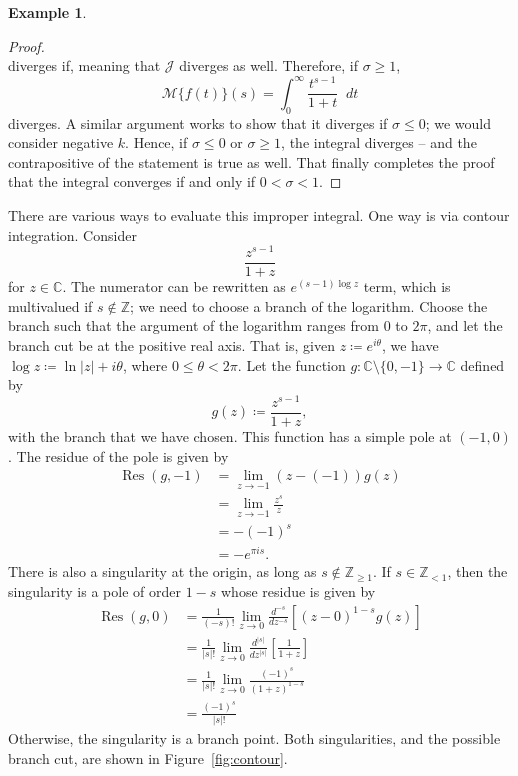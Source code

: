 \documentclass[a4paper]{article}
\newcommand*\diff{\mathop{}\!d} %
\newcommand{\C}{\mathbb{C}}
\newcommand{\Z}{\mathbb{Z}}
\DeclareMathOperator{\Res}{Res}
\theoremstyle{definition}
\newtheorem{example}[theorem]{Example}
\begin{document}
\begin{example}
\begin{proof}
\begin{equation*}
        \end{equation*}
        diverges if, meaning that $\mathcal{J}$ diverges as well.
        Therefore, if $\sigma \geq 1$,
        \begin{equation*}
            \mathcal{M}\{f(t)\}(s) = \int_0^\infty \frac{t^{s-1}}{1+t} \diff t
        \end{equation*}
        diverges.
        A similar argument works to show that it diverges if $\sigma \leq 0$; we would consider negative $k$.
        Hence, if $\sigma \leq 0$ or $\sigma \geq 1$, the integral diverges -- and the contrapositive of the statement is true as well.
        That finally completes the proof that the integral converges if and only if $0 < \sigma < 1$.
    \end{proof}
    There are various ways to evaluate this improper integral.
    One way is via contour integration.
    Consider
    \begin{equation*}
        \frac{z^{s-1}}{1+z}
    \end{equation*}
    for $z \in \C$.
    The numerator can be rewritten as $e^{(s-1) \log z}$ term, which is multivalued if $s \notin \Z$; we need to choose a branch of the logarithm.
    Choose the branch such that the argument of the logarithm ranges from 0 to $2\pi$, and let the branch cut be at the positive real axis.
    That is, given $z \coloneq e^{i \theta}$, we have $\log z \coloneq \ln \lvert z \rvert + i\theta$, where $0 \leq \theta < 2\pi$.
    Let the function $g \colon \C \setminus \{0, -1\} \to \C$ defined by
    \begin{equation*}
        g(z) \coloneq \frac{z^{s-1}}{1+z},
    \end{equation*}
    with the branch that we have chosen.
    This function has a simple pole at $(-1,0)$.
    The residue of the pole is given by
    \begin{align*}
        \Res (g,-1) & = \lim_{z \to -1} (z-(-1))g(z) \\&= \lim_{z \to -1} \frac{z^s}{z} \\&= -(-1)^s \\&= -e^{\pi i s}.
    \end{align*}
    There is also a singularity at the origin, as long as $s \notin \Z_{\geq 1}$.
    If $s \in \Z_{<1}$, then the singularity is a pole of order $1-s$ whose residue is given by
    \begin{align*}
        \Res (g, 0) & = \frac{1}{(-s)!} \lim_{z \to 0} \frac{d^{-s}}{dz^{-s}} \left[ (z-0)^{1-s} g(z) \right]                                   \\
                    & = \frac{1}{\lvert s \rvert!} \lim_{z \to 0} \frac{d^{\lvert s \rvert}}{dz^{\lvert s \rvert}} \left[ \frac{1}{1+z} \right] \\
                    & = \frac{1}{\lvert s \rvert!} \lim_{z \to 0} \frac{(-1)^s}{(1+z)^{1-s}}                                                    \\
                    & = \frac{(-1)^s}{\lvert s \rvert!}
    \end{align*}
    Otherwise, the singularity is a branch point.
    Both singularities, and the possible branch cut, are shown in Figure~\ref{fig:contour}.


\end{example}
\end{document}
